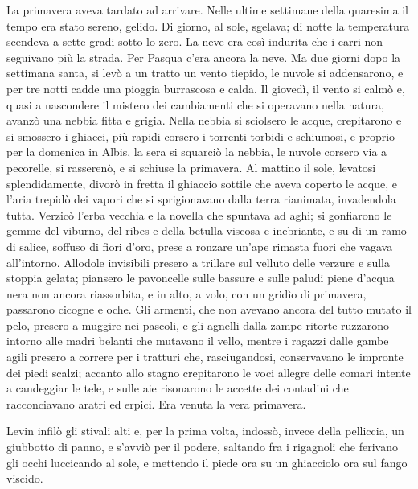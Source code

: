 La primavera aveva tardato ad arrivare. Nelle ultime settimane della quaresima il tempo era stato sereno, gelido. Di giorno, al sole, sgelava; di notte la temperatura scendeva a sette gradi sotto lo zero. La neve era così indurita che i carri non seguivano più la strada. Per Pasqua c'era ancora la neve. Ma due giorni dopo la settimana santa, si levò a un tratto un vento tiepido, le nuvole si addensarono, e per tre notti cadde una pioggia burrascosa e calda. Il giovedì, il vento si calmò e, quasi a nascondere il mistero dei cambiamenti che si operavano nella natura, avanzò una nebbia fitta e grigia. Nella nebbia si sciolsero le acque, crepitarono e si smossero i ghiacci, più rapidi corsero i torrenti torbidi e schiumosi, e proprio per la domenica in Albis, la sera si squarciò la nebbia, le nuvole corsero via a pecorelle, si rasserenò, e si schiuse la primavera. Al mattino il sole, levatosi splendidamente, divorò in fretta il ghiaccio sottile che aveva coperto le acque, e l'aria trepidò dei vapori che si sprigionavano dalla terra rianimata, invadendola tutta. Verzicò l'erba vecchia e la novella che spuntava ad aghi; si gonfiarono le gemme del viburno, del ribes e della betulla viscosa e inebriante, e su di un ramo di salice, soffuso di fiori d'oro, prese a ronzare un'ape rimasta fuori che vagava all'intorno. Allodole invisibili presero a trillare sul velluto delle verzure e sulla stoppia gelata; piansero le pavoncelle sulle bassure e sulle paludi piene d'acqua nera non ancora riassorbita, e in alto, a volo, con un gridìo di primavera, passarono cicogne e oche. Gli armenti, che non avevano ancora del tutto mutato il pelo, presero a muggire nei pascoli, e gli agnelli dalla zampe ritorte ruzzarono intorno alle madri belanti che mutavano il vello, mentre i ragazzi dalle gambe agili presero a correre per i tratturi che, rasciugandosi, conservavano le impronte dei piedi scalzi; accanto allo stagno crepitarono le voci allegre delle comari intente a candeggiar le tele, e sulle aie risonarono le accette dei contadini che racconciavano aratri ed erpici. Era venuta la vera primavera. 

Levin infilò gli stivali alti e, per la prima volta, indossò, invece della pelliccia, un giubbotto di panno, e s'avviò per il podere, saltando fra i rigagnoli che ferivano gli occhi luccicando al sole, e mettendo il piede ora su un ghiacciolo ora sul fango viscido. 

